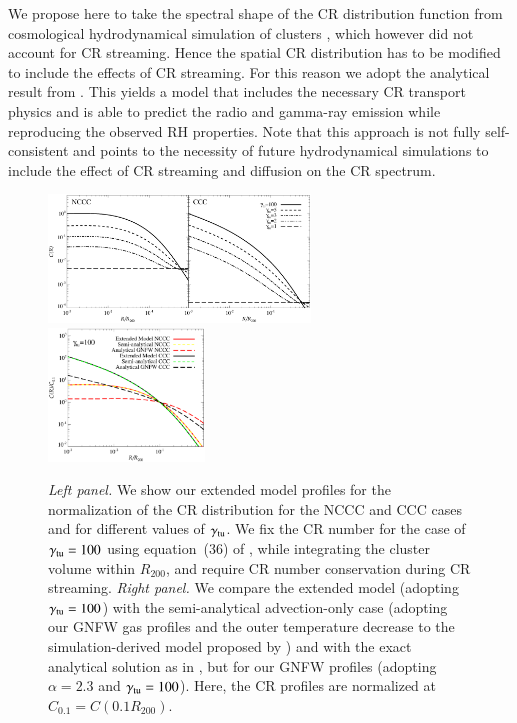 \documentclass[useAMS,usenatbib]{mn2e}
\begin{document}
We propose here to take the spectral shape of the CR distribution function from
cosmological hydrodynamical simulation of clusters \citep{2010MNRAS.409..449P},
which however did not account for CR streaming. Hence the spatial CR
distribution has to be modified to include the effects of CR streaming. For this
reason we adopt the analytical result from \citet{2011A&A...527A..99E}. This
yields a model that includes the necessary CR transport physics and is able to
predict the radio and gamma-ray emission while reproducing the observed RH
properties. Note that this approach is not fully self-consistent and points to
the necessity of future hydrodynamical simulations to include the effect of CR
streaming and diffusion on the CR spectrum.

\begin{figure} 
\centering
\includegraphics[width=0.62\textwidth]{figures/CR_profiles_FinalModel.eps}
\includegraphics[width=0.37\textwidth]{figures/CR_profiles_FinalModelvsREX_norm0.1.eps}
\caption{\emph{Left panel.} We show our extended model profiles for the
  normalization of the CR distribution for the NCCC and CCC cases and for
  different values of $\gamma_{{\mathrm{tu}}}$. We fix the CR number for the case of
  $\gamma_{{\mathrm{tu}}}=100$ using equation~(36) of \protect\cite{2011A&A...527A..99E},
  while integrating the cluster volume within $R_{200}$, and require CR number
  conservation during CR streaming. \emph{Right panel.} We compare the
  extended model (adopting $\gamma_{{\mathrm{tu}}}=100$) with the semi-analytical
  advection-only case (adopting our GNFW gas profiles and the outer temperature
  decrease to the simulation-derived model proposed by
  \protect\citealp{2010MNRAS.409..449P}) and with the exact analytical solution as in
  \protect\citet{2011A&A...527A..99E}, but for our GNFW profiles (adopting $\alpha=2.3$
  and $\gamma_{{\mathrm{tu}}}=100$). Here, the CR profiles are normalized at
  $C_{0.1}=C(0.1R_{200})$.}
\label{fig:CRFinalModel}
\end{figure}
\end{document}
